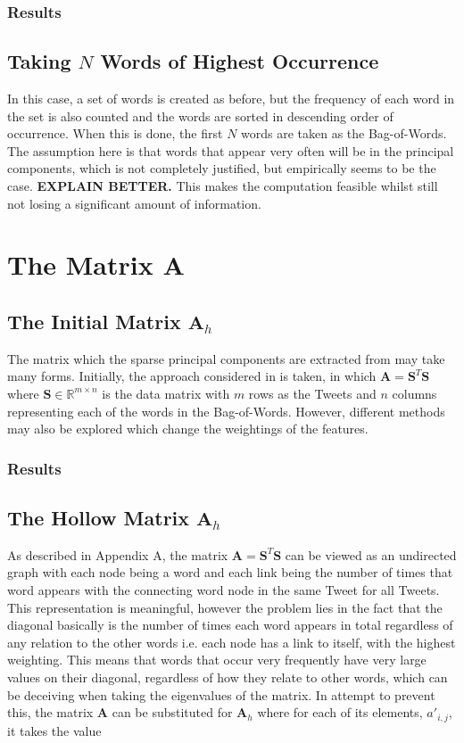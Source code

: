 \documentclass[11pt,a4paper]{article}
\begin{document}
\subsubsection{Results}
\subsection{Taking $N$ Words of Highest Occurrence}
In this case, a set of words is created as before, but the frequency of each word in the set is also counted and the words are sorted in descending order of occurrence. When this is done, the first $N$ words are taken as the Bag-of-Words. The assumption here is that words that appear very often will be in the principal components, which is not completely justified, but empirically seems to be the case. \textbf{EXPLAIN BETTER.} This makes the computation feasible whilst still not losing a significant amount of information. 

\section{The Matrix $\mathbf{A}$}
\subsection{The Initial Matrix $\mathbf{A}_{h}$}
The matrix which the sparse principal components are extracted from may take many forms. Initially, the approach considered in \cite{dimakis} is taken, in which $\mathbf{A} = \mathbf{S}^T \mathbf{S}$ where $\mathbf{S} \in \mathbb{R}^{m \times n}$ is the data matrix with $m$ rows as the Tweets and $n$ columns representing each of the words in the Bag-of-Words. However, different methods may also be explored which change the weightings of the features.
\subsubsection{Results}

\subsection{The Hollow Matrix $\mathbf{A}_{h}$}
As described in Appendix A, the matrix $\mathbf{A} = \mathbf{S}^T \mathbf{S}$ can be viewed as an undirected graph with each node being a word and each link being the number of times that word appears with the connecting word node in the same Tweet for all Tweets. This representation is meaningful, however the problem lies in the fact that the diagonal basically is the number of times each word appears in total regardless of any relation to the other words i.e. each node has a link to itself, with the highest weighting. This means that words that occur very frequently have very large values on their diagonal, regardless of how they relate to other words, which can be deceiving when taking the eigenvalues of the matrix. In attempt to prevent this, the matrix $\mathbf{A}$ can be substituted for 
$\mathbf{A}_h$ where for each of its elements, $a'_{i, j}$, it takes the value 
\end{document}
